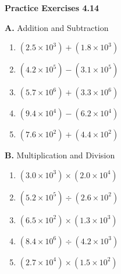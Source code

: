\vspace{0.3ex}
\noindent\textbf{Practice Exercises 4.14}

\vspace{0.2ex}

\begin{multicols}{2}
\noindent\textbf{A.} Addition and Subtraction
\begin{enumerate}
    \item \( (2.5 \times 10^3) + (1.8 \times 10^3) \)  
    \item \( (4.2 \times 10^5) - (3.1 \times 10^5) \)  
    \item \( (5.7 \times 10^6) + (3.3 \times 10^6) \)  
    \item \( (9.4 \times 10^4) - (6.2 \times 10^4) \)  
    \item \( (7.6 \times 10^2) + (4.4 \times 10^2) \)  
\end{enumerate}

\noindent\textbf{B.} Multiplication and Division
\begin{enumerate}
    \item \( (3.0 \times 10^3) \times (2.0 \times 10^4) \)  
    \item \( (5.2 \times 10^5) \div (2.6 \times 10^2) \)  
    \item \( (6.5 \times 10^2) \times (1.3 \times 10^3) \)  
    \item \( (8.4 \times 10^6) \div (4.2 \times 10^3) \)  
    \item \( (2.7 \times 10^4) \times (1.5 \times 10^2) \)  
\end{enumerate}
\end{multicols}
